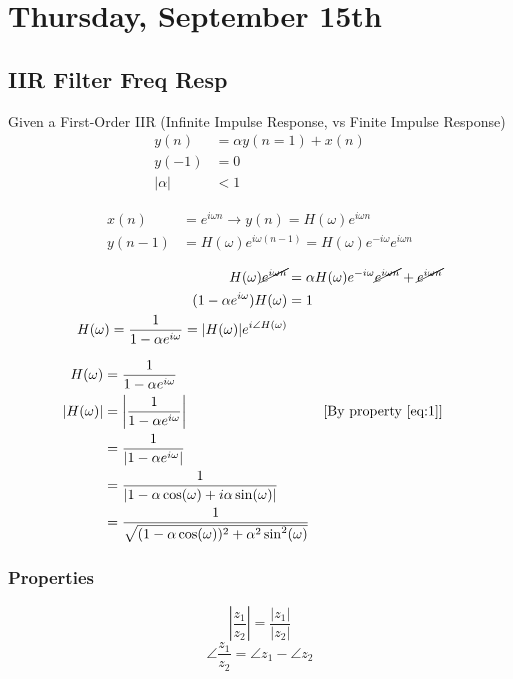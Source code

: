 \section{Thursday, September 15th}
\subsection{IIR Filter Freq Resp}
Given a First-Order IIR (Infinite Impulse Response, vs Finite Impulse Response)
\begin{align*}
    y(n)
    &=
    \alpha y(n=1)+x(n)
    \\
    y(-1)
    &=
    0
    \\
    |\alpha|
    &<
    1
\end{align*}

\begin{align*}
    x(n)
    &=
    e^{i\omega n} \to y(n)=H(\omega)e^{i\omega n}
    \\
    y(n-1)
    &=
    H(\omega)e^{i\omega (n-1)} = H(\omega)e^{-i\omega}e^{i\omega n}
\end{align*}

\begin{align*}
    H(\omega)\cancel{e^{i\omega n}} 
    &= \alpha H(\omega)e^{-i\omega}\cancel{e^{i\omega n}}+\cancel{e^{i\omega n}}
    \\
    (1-\alpha e^{i\omega})H(\omega) 
    &= 1
    \\
    H(\omega) 
    = \frac1{1-\alpha e^{i\omega}} 
    = |H(\omega)|e^{i\angle H(\omega)}
\end{align*}

\begin{align*}
    H(\omega) 
    &= \frac1{1-\alpha e^{i\omega}}
    \\
    |H(\omega)| 
    &= \left|\frac1{1-\alpha e^{i\omega}}\right|
    &&\text{[By property \eqref{eq:1}]}
    \\
    &= \frac1{|1-\alpha e^{i\omega}|}
    \\
    &= \frac1{|1-\alpha\cos(\omega)+i\alpha\sin(\omega)|}
    \\
    &= \frac1{\sqrt{(1-\alpha\cos(\omega))^2+\alpha^2\sin^2(\omega)}}
\end{align*}

\subsubsection{Properties}
\begin{equation}\label{eq:1}
    \left|\frac{z_1}{z_2}\right| = \frac{|z_1|}{|z_2|}
\end{equation}
\[
    \angle \frac{z_1}{z_2} = \angle z_1 - \angle z_2
\]

